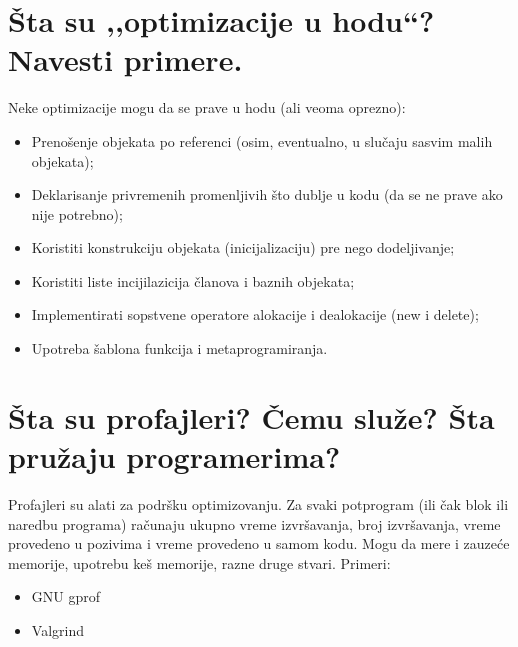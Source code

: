 \documentclass[a4paper]{article}
\begin{document}
\section{Šta su ,,optimizacije u hodu``? Navesti primere.}
  
  Neke optimizacije mogu da se prave u hodu (ali veoma oprezno):
  \begin{itemize}
    \item Prenošenje objekata po referenci (osim, eventualno, u slučaju sasvim malih objekata);
    \item Deklarisanje privremenih promenljivih što dublje u kodu (da se ne prave ako nije potrebno);
    \item Koristiti konstrukciju objekata (inicijalizaciju) pre nego dodeljivanje;
    \item Koristiti liste incijilazicija članova i baznih objekata;
    \item Implementirati sopstvene operatore alokacije i dealokacije (new i delete);
    \item Upotreba šablona funkcija i metaprogramiranja.
  \end{itemize}
\section{Šta su profajleri? Čemu služe? Šta pružaju programerima?}
  Profajleri su alati za podršku optimizovanju. Za svaki potprogram 
  (ili čak blok ili naredbu programa) računaju ukupno vreme izvršavanja, 
  broj izvršavanja, vreme provedeno u pozivima i vreme provedeno u samom kodu.
  Mogu da mere i zauzeće memorije, upotrebu keš memorije, razne druge stvari. Primeri:
  \begin{itemize}
    \item GNU gprof
    \item Valgrind
  \end{itemize}
  
\end{document}

